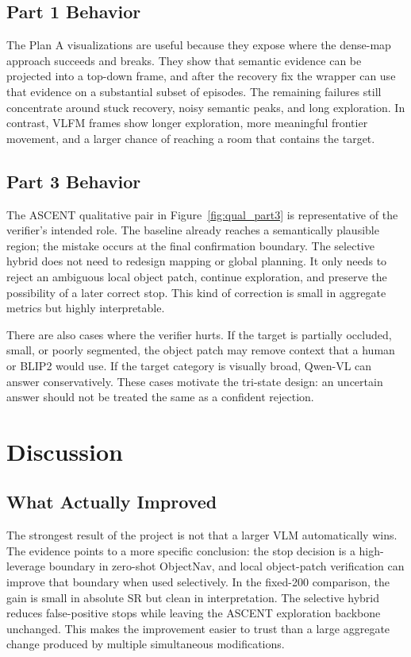 \documentclass[10pt,twocolumn,letterpaper]{article}
\begin{document}
\subsection{Part 1 Behavior}
The Plan A visualizations are useful because they expose where the dense-map approach succeeds and breaks. They show that semantic evidence can be projected into a top-down frame, and after the recovery fix the wrapper can use that evidence on a substantial subset of episodes. The remaining failures still concentrate around stuck recovery, noisy semantic peaks, and long exploration. In contrast, VLFM frames show longer exploration, more meaningful frontier movement, and a larger chance of reaching a room that contains the target.

\subsection{Part 3 Behavior}
The ASCENT qualitative pair in Figure~\ref{fig:qual_part3} is representative of the verifier's intended role. The baseline already reaches a semantically plausible region; the mistake occurs at the final confirmation boundary. The selective hybrid does not need to redesign mapping or global planning. It only needs to reject an ambiguous local object patch, continue exploration, and preserve the possibility of a later correct stop. This kind of correction is small in aggregate metrics but highly interpretable.

There are also cases where the verifier hurts. If the target is partially occluded, small, or poorly segmented, the object patch may remove context that a human or BLIP2 would use. If the target category is visually broad, Qwen-VL can answer conservatively. These cases motivate the tri-state design: an uncertain answer should not be treated the same as a confident rejection.

\section{Discussion}
\subsection{What Actually Improved}
The strongest result of the project is not that a larger VLM automatically wins. The evidence points to a more specific conclusion: the stop decision is a high-leverage boundary in zero-shot ObjectNav, and local object-patch verification can improve that boundary when used selectively. In the fixed-200 comparison, the gain is small in absolute SR but clean in interpretation. The selective hybrid reduces false-positive stops while leaving the ASCENT exploration backbone unchanged. This makes the improvement easier to trust than a large aggregate change produced by multiple simultaneous modifications.
\end{document}
